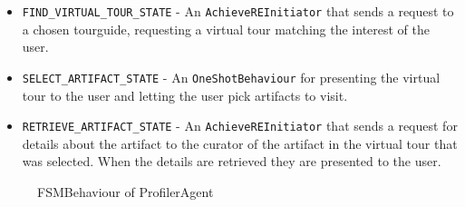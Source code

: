 \documentclass[a4paper, 11pt]{article}
\begin{document}
\begin{itemize}
\begin{itemize}
\begin{itemize}
\item \texttt{FIND\_VIRTUAL\_TOUR\_STATE} - An \texttt{AchieveREInitiator} that sends a request to a chosen tourguide, requesting a virtual tour matching the interest of the user.
\item \texttt{SELECT\_ARTIFACT\_STATE} - An \texttt{OneShotBehaviour} for presenting the virtual tour to the user and letting the user pick artifacts to visit.
\item \texttt{RETRIEVE\_ARTIFACT\_STATE} - An \texttt{AchieveREInitiator} that sends a request for details about the artifact to the curator of the artifact in the virtual tour that was selected. When the details are retrieved they are presented to the user.
\end{itemize}
\end{itemize}
\begin{figure}[H]
  \begin{center}
    \caption{FSMBehaviour of ProfilerAgent}
    \label{fig:fsm}
  \end{center}
\end{figure}
\end{itemize}
\end{document}
